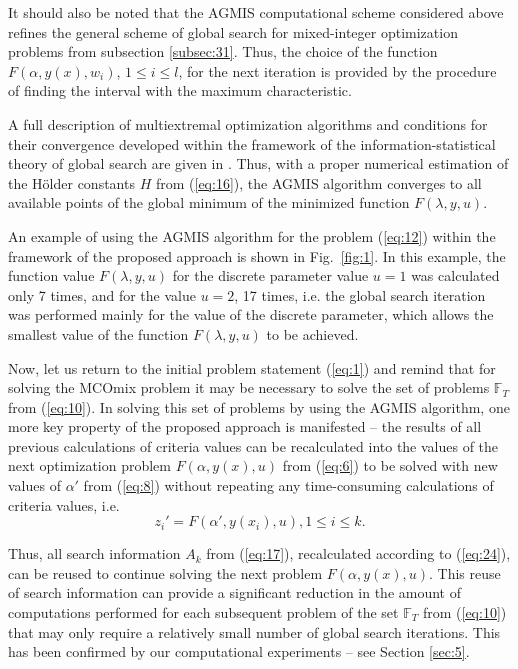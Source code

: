\documentclass{svproc}
\begin{document}
It should also be noted that the AGMIS computational scheme considered above refines the general scheme of global search for mixed-integer optimization problems from subsection \ref{subsec:31}. Thus, the choice of the function $F(\alpha, y(x), w_i)$, $1\leq i\leq l$, for the next iteration is provided by the procedure of finding the interval with the maximum characteristic.

A full description of multiextremal optimization algorithms and conditions for their convergence developed within the framework of the information-statistical theory of global search are given in \cite{c24}. Thus, with a proper numerical estimation of the H{\"o}lder constants $H$ from (\ref{eq:16}), the AGMIS algorithm converges to all available points of the global minimum of the minimized function $F(\lambda, y, u)$.
 
An example of using the AGMIS algorithm for the problem (\ref{eq:12}) within the framework of the proposed approach is shown in Fig.~\ref{fig:1}. In this example, the function value $F(\lambda, y, u)$ for the discrete parameter value $u=1$ was calculated only 7 times, and for the value $u=2$, 17 times, i.e. the global search iteration was performed mainly for the value of the discrete parameter, which allows the smallest value of the function $F(\lambda, y, u)$ to be achieved.

Now, let us return to the initial problem statement (\ref{eq:1}) and remind that for solving the MCOmix problem it may be necessary to solve the set of problems $\mathbb{F}_T$ from (\ref{eq:10}). In solving this set of problems by using the AGMIS algorithm, one more key property of the proposed approach is manifested -- the results of all previous  calculations of criteria values can be recalculated into the values of the next optimization problem $F(\alpha, y(x), u)$ from (\ref{eq:6}) to be solved with new values of $\alpha'$ from (\ref{eq:8}) without repeating any time-consuming calculations of criteria values, i.e.
\begin{equation}\label{eq:24}
 z_i'=F(\alpha',y(x_i), u), 1 \leq i \leq k.
\end{equation}

Thus, all search information $A_k$ from (\ref{eq:17}), recalculated according to (\ref{eq:24}), can be reused to continue solving the next problem $F(\alpha, y(x), u)$.  This reuse of search information can provide a significant reduction in the amount of computations performed for each subsequent problem of the set $\mathbb{F}_T$ from (\ref{eq:10})  that may only require a relatively small number of global search iterations. This  has been confirmed  by our computational experiments -- see Section \ref{sec:5}.
\end{document}
